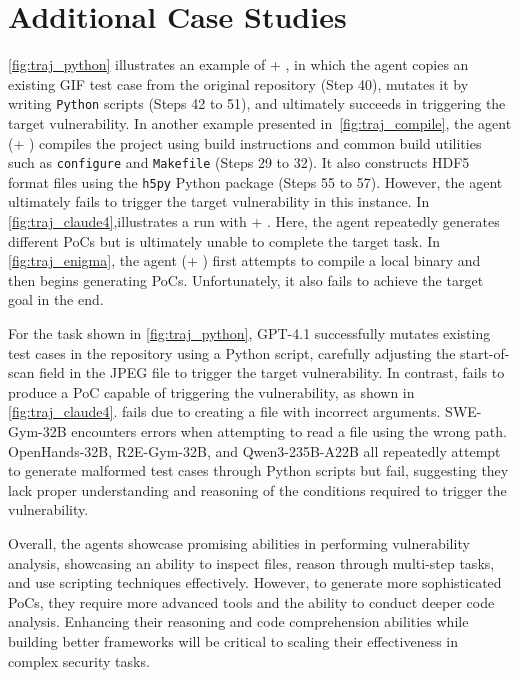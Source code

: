\section{Additional Case Studies}
\label{app:examples}

\cref{fig:traj_python} illustrates an example of \openhands + \gptiv, in which the agent copies an existing GIF test case from the original repository (Step 40), mutates it by writing \texttt{Python} scripts (Steps 42 to 51), and ultimately succeeds in triggering the target vulnerability.
In another example presented in~\cref{fig:traj_compile}, the agent (\openhands + \gptiv) compiles the project using build instructions and common build utilities such as \texttt{configure} and \texttt{Makefile} (Steps 29 to 32).
It also constructs HDF5 format files using the \texttt{h5py} Python package (Steps 55 to 57).
However, the agent ultimately fails to trigger the target vulnerability in this instance.
In \cref{fig:traj_claude4},illustrates a run with \openhands + \claudeiv. Here, the agent repeatedly generates different PoCs but is ultimately unable to complete the target task.
In \cref{fig:traj_enigma}, the agent (\enigma + \gptiv) first attempts to compile a local binary and then begins generating PoCs. Unfortunately, it also fails to achieve the target goal in the end.

For the task shown in \cref{fig:traj_python}, GPT-4.1 successfully mutates existing test cases in the repository using a Python script, carefully adjusting the start-of-scan field in the JPEG file to trigger the target vulnerability. In contrast, \claudeiv fails to produce a PoC capable of triggering the vulnerability, as shown in \cref{fig:traj_claude4}. \claudeiii fails due to creating a file with incorrect arguments. SWE-Gym-32B encounters errors when attempting to read a file using the wrong path. OpenHands-32B, R2E-Gym-32B, and Qwen3-235B-A22B all repeatedly attempt to generate malformed test cases through Python scripts but fail, suggesting they lack proper understanding and reasoning of the conditions required to trigger the vulnerability.

Overall, the agents showcase promising abilities in performing vulnerability analysis, showcasing an ability to inspect files, reason through multi-step tasks, and use scripting techniques effectively.
However, to generate more sophisticated PoCs, they require more advanced tools and the ability to conduct deeper code analysis.
Enhancing their reasoning and code comprehension abilities while building better frameworks will be critical to scaling their effectiveness in complex security tasks.





